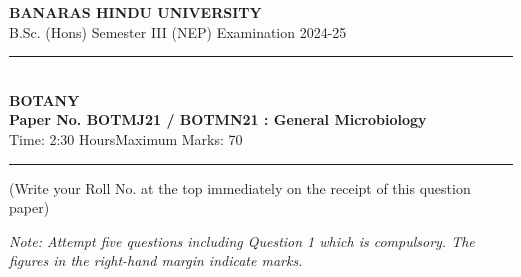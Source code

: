 \documentclass[11pt,a4paper]{article}
\begin{document}
\begin{center}
  {\large\bfseries BANARAS HINDU UNIVERSITY}\\[2pt]
  {\normalsize B.Sc. (Hons) Semester III (NEP) Examination 2024-25}\\[6pt]
  \rule{0.8\linewidth}{0.5pt}\\[6pt]
  {\large\bfseries BOTANY}\\[4pt]
  {\large\bfseries Paper No. BOTMJ21 / BOTMN21 : General Microbiology}\\[4pt]
  {\normalsize Time: 2:30 Hours\hfill Maximum Marks: 70}
\end{center}

\rule{\linewidth}{0.4pt}

\smallskip



\noindent (Write your Roll No. at the top immediately on the receipt of this question paper)

\smallskip



\noindent   \textit{Note: Attempt five questions including Question 1 which is compulsory. The figures in the right-hand margin indicate marks.}

\bigskip
\end{document}
